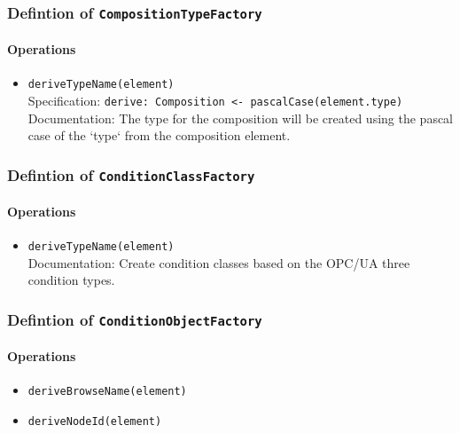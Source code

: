 \subsubsection{Defintion of \texttt{CompositionTypeFactory}} \label{type:CompositionTypeFactory}

\FloatBarrier



\paragraph{Operations}
\begin{itemize}
  \item \texttt{deriveTypeName(element)}\\
    Specification: \texttt{derive: Composition <-
 pascalCase(element.type)}
\\
    Documentation: The type for the composition will be created using the pascal case of the `type` from the composition element.

\end{itemize}
\subsubsection{Defintion of \texttt{ConditionClassFactory}} \label{type:ConditionClassFactory}

\FloatBarrier



\paragraph{Operations}
\begin{itemize}
  \item \texttt{deriveTypeName(element)}\\
    Documentation: Create condition classes based on the OPC/UA three condition  types.

\end{itemize}
\subsubsection{Defintion of \texttt{ConditionObjectFactory}} \label{type:ConditionObjectFactory}

\FloatBarrier



\paragraph{Operations}
\begin{itemize}
  \item \texttt{deriveBrowseName(element)}
  \item \texttt{deriveNodeId(element)}
\end{itemize}
